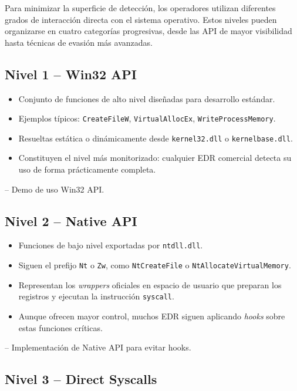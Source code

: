 Para minimizar la superficie de detección, los operadores utilizan diferentes grados de interacción directa con el sistema operativo. Estos niveles pueden organizarse en cuatro categorías progresivas, desde las API de mayor visibilidad hasta técnicas de evasión más avanzadas.

\subsection{Nivel 1 – Win32 API}

\begin{itemize}
\item Conjunto de funciones de alto nivel diseñadas para desarrollo estándar.
\item Ejemplos típicos: \texttt{CreateFileW}, \texttt{VirtualAllocEx}, \texttt{WriteProcessMemory}.
\item Resueltas estática o dinámicamente desde \texttt{kernel32.dll} o \texttt{kernelbase.dll}.
\item Constituyen el nivel más monitorizado: cualquier EDR comercial detecta su uso de forma prácticamente completa.
\end{itemize}

\cite{ref:win32api} – Demo de uso Win32 API.  

\subsection{Nivel 2 – Native API}

\begin{itemize}
\item Funciones de bajo nivel exportadas por \texttt{ntdll.dll}.
\item Siguen el prefijo \texttt{Nt} o \texttt{Zw}, como \texttt{NtCreateFile} o \texttt{NtAllocateVirtualMemory}.
\item Representan los \textit{wrappers} oficiales en espacio de usuario que preparan los registros y ejecutan la instrucción \texttt{syscall}.
\item Aunque ofrecen mayor control, muchos EDR siguen aplicando \textit{hooks} sobre estas funciones críticas.
\end{itemize}

\cite{ref:nativeapi} – Implementación de Native API para evitar hooks.  

\subsection{Nivel 3 – Direct Syscalls}

